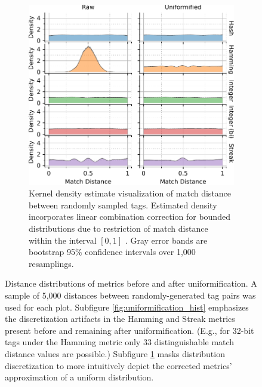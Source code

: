 \begin{figure}
\begin{center}
\begin{minipage}{\linewidth}
\begin{subfigure}[b]{\linewidth}
\begin{minipage}{0.75\textwidth}
\begin{center}
\includegraphics[width=\columnwidth]{img/uniformification/bitweight=0dot5+seed=1+title=low-score-distribution+viz=kde+_data_hathash_hash=75684cf1e73fb7f1+_script_fullcat_hash=73c1663bd9b49595+ext=}
\end{center}
\end{minipage}
\begin{minipage}{0.23\textwidth}
\caption{
Kernel density estimate visualization of match distance between randomly sampled tags.
Estimated density incorporates linear combination correction for bounded distributions due to restriction of match distance within the interval $[0,1]$ \citep{jones1993simple}.
Gray error bands are bootstrap 95\% confidence intervals over 1,000 resamplings.
}
\label{fig:uniformification_kde}
\end{minipage}
\end{subfigure}
\end{minipage}

\caption{
Distance distributions of metrics before and after uniformification.
A sample of 5,000 distances between randomly-generated tag pairs was used for each plot.
Subfigure \ref{fig:uniformification_hist} emphasizes the discretization artifacts in the Hamming and Streak metrics present before and remaining after uniformification.
(E.g., for 32-bit tags under the Hamming metric only 33 distinguishable match distance values are possible.)
Subfigure \ref{fig:uniformification_kde} masks distribution discretization to more intuitively depict the corrected metrics' approximation of a uniform distribution.
}
\label{fig:uniformification}

\end{center}
\end{figure}

